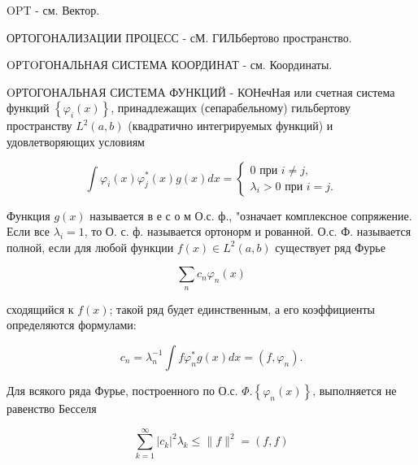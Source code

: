\documentclass[10pt]{article}
\begin{document}
OPT - см. Вектор.



ОРТОГОНАЛИЗАЦИИ ПРОЦЕСС - сМ. ГИЛЬбертово пространство.



OРTOГОНАЛЬНАЯ СИСТЕМА КООРДИНАТ - см. Координаты.



OРТОГОНАЛЬНАЯ СИСТЕМА ФУНКЦИЙ - КОНечНая или счетная система функций $\left\{\varphi_{i}(x)\right\}$, принадлежащих (сепарабельному) гильбертову пространству $L^{2}(a, b)$ (квадратично интегрируемых функций) и удовлетворяющих условиям



\[

\int \varphi_{i}(x) \varphi_{j}^{*}(x) g(x) d x=\left\{\begin{array}{l}

0 \text { при } i \neq j, \\

\lambda_{i}>0 \text { при } i=j .

\end{array}\right.

\]



Функция $g(x)$ называется в е с о м О.с. ф., "означает комплексное сопряжение. Если все $\lambda_{i}=1$, то О. с. ф. называется ортонорм и рованной. О.с. Ф. называется полной, если для любой функции $f(x) \in L^{2}(a, b)$ существует ряд Фурье



\[

\sum_{n} c_{n} \varphi_{n}(x)

\]



сходящийся к $f(x)$; такой ряд будет единственным, а его коэффициенты определяются формулами:



\[

c_{n}=\lambda_{n}^{-1} \int f \varphi_{n}^{*} g(x) d x=\left(f, \varphi_{n}\right) .

\]



Для всякого ряда Фурье, построенного по О.с. $\Phi .\left\{\varphi_{n}(x)\right\}$, выполняется не равенство Бесселя



\[

\sum_{k=1}^{\infty}\left|c_{k}\right|^{2} \lambda_{k} \leqslant\|f\|^{2}=(f, f)

\]
\end{document}
